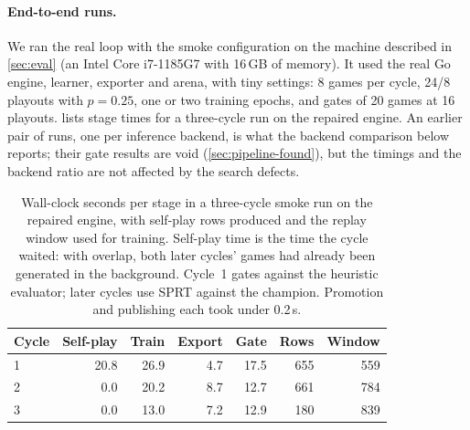 \paragraph{End-to-end runs.}
We ran the real loop with the smoke configuration on the machine described in
\cref{sec:eval} (an Intel Core i7-1185G7 with 16\,GB of memory). It used the real Go
engine, learner, exporter and arena, with tiny settings: 8 games per cycle, 24/8 playouts
with $p=0.25$, one or two training epochs, and gates of 20 games at 16 playouts.
 lists stage times for a three-cycle run on the repaired engine.
An earlier pair of runs, one per inference backend, is what the backend comparison below
reports; their gate results are void (\cref{sec:pipeline-found}), but the timings and the
backend ratio are not affected by the search defects.

\begin{table}[htbp]
\centering
\small
\begin{tabular}{@{}lrrrrrr@{}}
\toprule
Cycle & Self-play & Train & Export & Gate & Rows & Window \\
\midrule
1 & 20.8 & 26.9 & 4.7 & 17.5 & 655 & 559 \\
2 &  0.0 & 20.2 & 8.7 & 12.7 & 661 & 784 \\
3 &  0.0 & 13.0 & 7.2 & 12.9 & 180 & 839 \\
\bottomrule
\end{tabular}
\caption{Wall-clock seconds per stage in a three-cycle smoke run on the repaired engine,
with self-play rows produced and the replay window used for training. Self-play time is
the time the cycle waited: with overlap, both later cycles' games had already been
generated in the background. Cycle~1 gates against the heuristic evaluator; later cycles
use SPRT against the champion. Promotion and publishing each took under 0.2\,s.}
\label{tab:pipeline-e2e}
\end{table}

